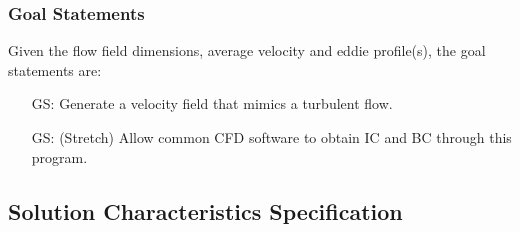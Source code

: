\documentclass[12pt]{article}
\newcounter{goalnum} %
\begin{document}


\subsubsection{Goal Statements}


\noindent Given the flow field dimensions, average velocity and eddie profile(s), the goal statements are:

\begin{itemize}

\item[GS\refstepcounter{goalnum}\thegoalnum \label{G_anyFlowField}:] Generate a velocity field that mimics a turbulent flow.
\item[GS\refstepcounter{goalnum}\thegoalnum \label{G_interfaceCFD}:] (Stretch) Allow common CFD software to obtain IC and BC through this program.


\end{itemize}

\subsection{Solution Characteristics Specification}
\end{document}
